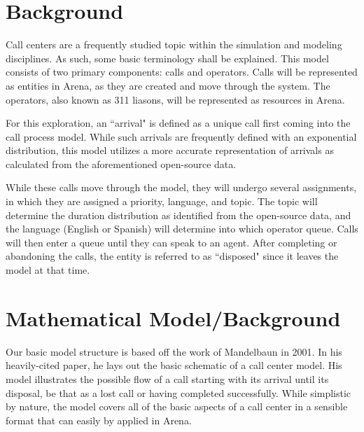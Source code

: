 \documentclass[11pt,twocolumn]{article}
\begin{document}
\section{Background}
Call centers are a frequently studied topic within the simulation and modeling disciplines.  As such, some basic terminology shall be explained.  This model consists of two primary components:  calls and operators.  Calls will be represented as entities in Arena, as they are created and move through the system.  The operators, also known as 311 liasons, will be represented as resources in Arena.
\par
For this exploration, an ``arrival" is defined as a unique call first coming into the call process model.  While such arrivals are frequently defined with an exponential distribution, this model utilizes a more accurate representation of arrivals as calculated from the aforementioned open-source data.  
\par
While these calls move through the model, they will undergo several assignments, in which they are assigned a priority, language, and topic.  The topic will determine the duration distribution as identified from the open-source data, and the language (English or Spanish) will determine into which operator queue.  Calls will then enter a queue until they can speak to an agent.  After completing or abandoning the calls, the entity is referred to as ``disposed" since it leaves the model at that time.


\section{Mathematical Model/Background}
Our basic model structure is based off the work of Mandelbaun in 2001.  In his heavily-cited paper, he lays out the basic schematic of a call center model.  His model illustrates the possible flow of a call starting with its arrival until its disposal, be that as a lost call or having completed successfully.\cite{mandelbaun}  While simplistic by nature, the model covers all of the basic aspects of a call center in a sensible format that can easily by applied in Arena.  
\end{document}
